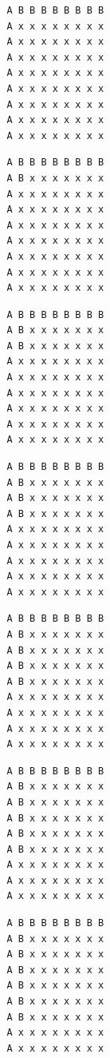 { \begin{verbatim}
         A B B B B B B B B
         A x x x x x x x x
         A x x x x x x x x
         A x x x x x x x x
         A x x x x x x x x
         A x x x x x x x x
         A x x x x x x x x
         A x x x x x x x x
         A x x x x x x x x
\end{verbatim} }

{ \begin{verbatim}
         A B B B B B B B B
         A B x x x x x x x
         A x x x x x x x x
         A x x x x x x x x
         A x x x x x x x x
         A x x x x x x x x
         A x x x x x x x x
         A x x x x x x x x
         A x x x x x x x x
\end{verbatim} }

{ \begin{verbatim}
         A B B B B B B B B
         A B x x x x x x x
         A B x x x x x x x
         A x x x x x x x x
         A x x x x x x x x
         A x x x x x x x x
         A x x x x x x x x
         A x x x x x x x x
         A x x x x x x x x
\end{verbatim} }

{ \begin{verbatim}
         A B B B B B B B B
         A B x x x x x x x
         A B x x x x x x x
         A B x x x x x x x
         A x x x x x x x x
         A x x x x x x x x
         A x x x x x x x x
         A x x x x x x x x
         A x x x x x x x x
\end{verbatim} }

{ \begin{verbatim}
         A B B B B B B B B
         A B x x x x x x x
         A B x x x x x x x
         A B x x x x x x x
         A B x x x x x x x
         A x x x x x x x x
         A x x x x x x x x
         A x x x x x x x x
         A x x x x x x x x
\end{verbatim} }

{ \begin{verbatim}
         A B B B B B B B B
         A B x x x x x x x
         A B x x x x x x x
         A B x x x x x x x
         A B x x x x x x x
         A B x x x x x x x
         A x x x x x x x x
         A x x x x x x x x
         A x x x x x x x x
\end{verbatim} }

{ \begin{verbatim}
         A B B B B B B B B
         A B x x x x x x x
         A B x x x x x x x
         A B x x x x x x x
         A B x x x x x x x
         A B x x x x x x x
         A B x x x x x x x
         A x x x x x x x x
         A x x x x x x x x
\end{verbatim} }

